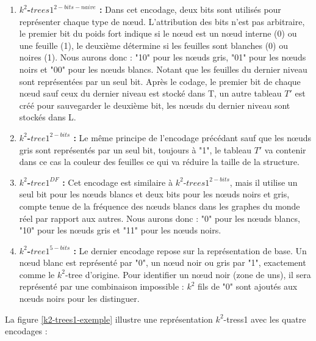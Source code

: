 \begin{enumerate}[label=$\bullet$]
\item \textbf{ $k^2$-$trees1^{2-bits-naive}$ :} Dans cet encodage, deux bits sont utilisés pour représenter chaque type de nœud. L'attribution des bits n'est pas arbitraire, le premier bit du poids fort indique si le nœud est un nœud interne (0) ou une feuille (1), le deuxième détermine si les feuilles sont blanches (0) ou noires (1). Nous aurons donc : "10" pour les nœuds gris, "01" pour les nœuds noirs et "00" pour les nœuds blancs. Notant que les feuilles du dernier niveau sont représentées par un seul bit.
Après le codage, le premier bit de chaque nœud sauf ceux du dernier niveau est stocké dans T, un autre tableau $T'$ est créé pour sauvegarder le deuxième bit, les nœuds du dernier niveau sont stockés dans L.
\item \textbf{ $k^2$-$tree1^{2-bits}$ :} Le même principe de l'encodage précédant sauf que les nœuds gris sont représentés par un seul bit, toujours à "1", le tableau $T'$ va contenir dans ce cas la couleur des feuilles ce qui va réduire la taille de la structure.
\item \textbf{ $k^2$-$tree1^{DF}$ :} Cet encodage est similaire à $k^2$-$trees1^{2-bits}$, mais il utilise un seul bit pour les nœuds blancs et deux bits pour les nœuds noirs et gris, compte tenue de la fréquence des nœuds blancs dans les graphes du monde réel par rapport aux autres. Nous aurons donc : "0" pour les nœuds blancs, "10" pour les nœuds gris et "11" pour les nœuds noirs.
\item \textbf{ $k^2$-$tree1^{5-bits}$ :} Le dernier encodage repose sur la représentation de base. Un nœud blanc est représenté par "0", un nœud noir ou gris par "1", exactement comme le $k^2$-tree d'origine. Pour identifier un nœud noir (zone de uns), il sera représenté par une combinaison impossible : $k^2$ fils de "0" sont ajoutés aux nœuds noirs pour les distinguer.
\end{enumerate}


La figure \ref{k2-trees1-exemple} illustre une représentation $k^2$-tress1 avec les quatre encodages \citep{de2014new} : 


